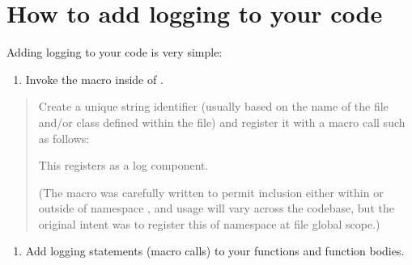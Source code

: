 \documentclass[letterpaper,10pt,english]{sphinxmanual}
\renewcommand{\sphinxcode}[1]{\texttt{\small{#1}}}
\begin{document}
\section{How to add logging to your code}
\label{\detokenize{logging:how-to-add-logging-to-your-code}}
Adding logging to your code is very simple:
\begin{enumerate}
%
\item {} 
Invoke the \sphinxcode{} macro
inside of \sphinxcode{}.

\end{enumerate}
\begin{quote}

Create a unique string identifier (usually based on the name of the file
and/or class defined within the file) and register it with a macro call
such as follows:

\begin{sphinxVerbatim}[commandchars=\\\{\}]
  

 
\end{sphinxVerbatim}

This registers \sphinxcode{} as a log component.

(The macro was carefully written to permit inclusion either within or
outside of namespace \sphinxcode{}, and usage will vary across the codebase, but
the original intent was to register this  of namespace \sphinxcode{}
at file global scope.)
\end{quote}
\begin{enumerate}
%
\setcounter{enumi}{1}
\item {} 
Add logging statements (macro calls) to your functions and function bodies.

\end{enumerate}
\end{document}
